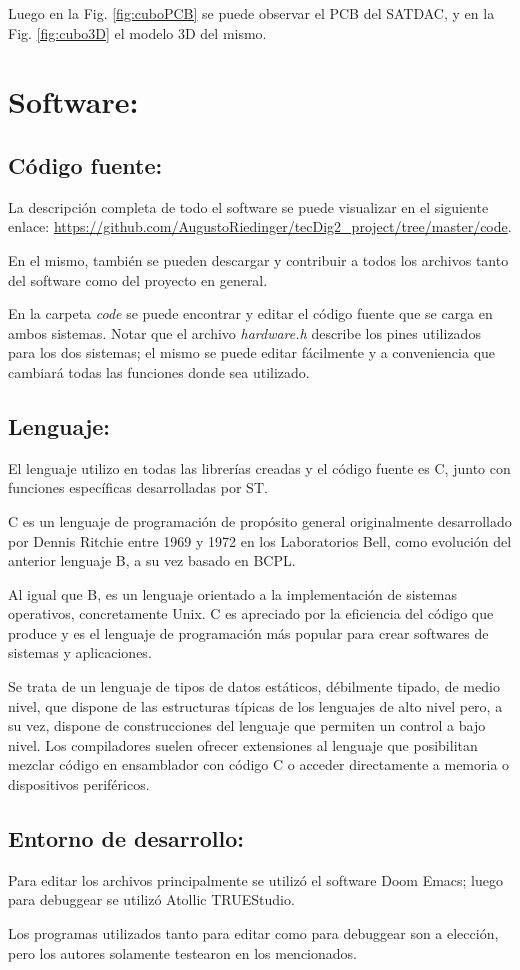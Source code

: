 \documentclass[conference]{IEEEtran}
\begin{document}
Luego en la Fig. \ref{fig:cuboPCB} se puede observar el PCB del SATDAC, y en la Fig. \ref{fig:cubo3D} el modelo 3D del mismo.

\section{Software:}
\label{sec:orgd5b25c3}
\subsection{Código fuente:}
\label{sec:orgdcccb64}
La descripción completa de todo el software se puede visualizar en el siguiente enlace: \url{https://github.com/AugustoRiedinger/tecDig2\_project/tree/master/code}.

En el mismo, también se pueden descargar y contribuir a todos los archivos tanto del software como del proyecto en general.

En la carpeta \emph{code} se puede encontrar y editar el código fuente que se carga en ambos sistemas. Notar que el archivo \emph{hardware.h} describe los pines utilizados para los dos sistemas; el mismo se puede editar fácilmente y a conveniencia que cambiará todas las funciones donde sea utilizado.
\subsection{Lenguaje:}
\label{sec:orgbc95e53}
El lenguaje utilizo en todas las librerías creadas y el código fuente es C, junto con funciones específicas desarrolladas por ST.

C es un lenguaje de programación de propósito general originalmente desarrollado por Dennis Ritchie entre 1969 y 1972 en los Laboratorios Bell,​ como evolución del anterior lenguaje B, a su vez basado en BCPL.

Al igual que B, es un lenguaje orientado a la implementación de sistemas operativos, concretamente Unix. C es apreciado por la eficiencia del código que produce y es el lenguaje de programación más popular para crear softwares de sistemas y aplicaciones.

Se trata de un lenguaje de tipos de datos estáticos, débilmente tipado, de medio nivel, que dispone de las estructuras típicas de los lenguajes de alto nivel pero, a su vez, dispone de construcciones del lenguaje que permiten un control a bajo nivel. Los compiladores suelen ofrecer extensiones al lenguaje que posibilitan mezclar código en ensamblador con código C o acceder directamente a memoria o dispositivos periféricos.

\subsection{Entorno de desarrollo:}
\label{sec:orgf0a4542}
Para editar los archivos principalmente se utilizó el software Doom Emacs; luego para debuggear se utilizó Atollic TRUEStudio.

Los programas utilizados tanto para editar como para debuggear son a elección, pero los autores solamente testearon en los mencionados.
\end{document}
